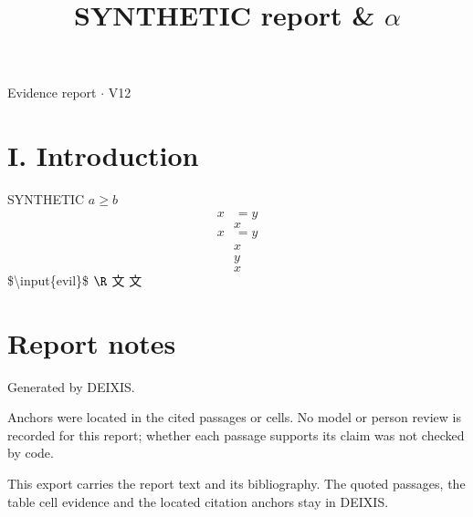 \documentclass[journal]{IEEEtran}
\begin{document}
\title{SYNTHETIC report \& \ensuremath{\alpha}}

\maketitle

\noindent Evidence report \ensuremath{\cdot} V12

\section*{I. Introduction}

SYNTHETIC $a\geq b$
\begin{align}x&=y\end{align}
\begin{equation*}
x\tag{z}
\end{equation*}
\begin{equation*}
\begin{aligned}
x&=y
\end{aligned}
\end{equation*}
\begin{equation*}
\begin{gathered}
x\\y
\end{gathered}
\end{equation*}
\begin{equation*}
x
\end{equation*}
\$\textbackslash{}input\{evil\}\$ $\R$ 文 $文$ \cite{Synth26}

\section*{Report notes}

Generated by DEIXIS.

Anchors were located in the cited passages or cells. No model or person review is recorded for this report; whether each passage supports its claim was not checked by code.

This export carries the report text and its bibliography. The quoted passages, the table cell evidence and the located citation anchors stay in DEIXIS.




\end{document}
